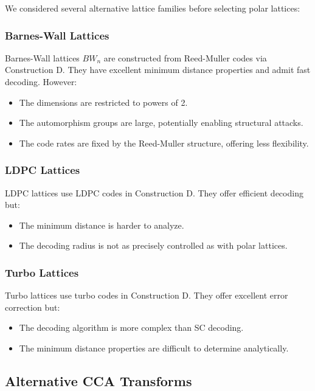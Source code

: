 \documentclass[11pt,a4paper]{article}
\begin{document}
We considered several alternative lattice families before selecting polar lattices:

\subsubsection{Barnes-Wall Lattices}

Barnes-Wall lattices $BW_n$ are constructed from Reed-Muller codes via Construction D. They have excellent minimum distance properties and admit fast decoding. However:
\begin{itemize}[leftmargin=2em]
\item The dimensions are restricted to powers of 2.
\item The automorphism groups are large, potentially enabling structural attacks.
\item The code rates are fixed by the Reed-Muller structure, offering less flexibility.
\end{itemize}

\subsubsection{LDPC Lattices}

LDPC lattices use LDPC codes in Construction D. They offer efficient decoding but:
\begin{itemize}[leftmargin=2em]
\item The minimum distance is harder to analyze.
\item The decoding radius is not as precisely controlled as with polar lattices.
\end{itemize}

\subsubsection{Turbo Lattices}

Turbo lattices use turbo codes in Construction D. They offer excellent error correction but:
\begin{itemize}[leftmargin=2em]
\item The decoding algorithm is more complex than SC decoding.
\item The minimum distance properties are difficult to determine analytically.
\end{itemize}

\subsection{Alternative CCA Transforms}
\end{document}
